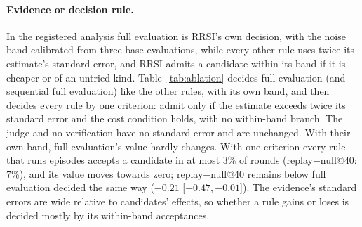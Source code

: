 \documentclass[11pt]{article}
\begin{document}
\begin{table}[t]
\centering
\small
\setlength{\tabcolsep}{3pt}
\caption{Agreement with full evaluation's acceptances on r2+r3 (21 acceptances in 80 rounds; post hoc). Recall: expected share of full evaluation's acceptances the rule also makes, with a 90\% block-bootstrap interval. Acc.: share of the rounds in which full evaluation keeps the incumbent where the rule accepts a candidate. Gain kept and dropped: mean held-out gain (points) of full evaluation's accepted candidates, weighted by the probability that the rule makes or does not make the same acceptance; Dropped: expected number it does not make. The last four columns split the difference in decision value: gains forgone by dropping helpful acceptances, harm avoided by dropping harmful ones, the value of what the rule accepts instead (another candidate, or one in a round where full evaluation keeps the incumbent), and the total. Lower block: sequential full evaluation on the other trajectories, with full evaluation's number of acceptances in parentheses.}
\label{tab:accept}
\end{table}

\paragraph{Evidence or decision rule.} In the registered analysis full evaluation is RRSI's own decision, with the noise band calibrated from three base evaluations, while every other rule uses twice its estimate's standard error, and RRSI admits a candidate within its band if it is cheaper or of an untried kind. Table~\ref{tab:ablation} decides full evaluation (and sequential full evaluation) like the other rules, with its own band, and then decides every rule by one criterion: admit only if the estimate exceeds twice its standard error and the cost condition holds, with no within-band branch. The judge and no verification have no standard error and are unchanged. With their own band, full evaluation's value hardly changes. With one criterion every rule that runs episodes accepts a candidate in at most 3\% of rounds (replay$-$null@40: 7\%), and its value moves towards zero; replay$-$null@40 remains below full evaluation decided the same way ($-0.21$ [$-0.47,-0.01$]). The evidence's standard errors are wide relative to candidates' effects, so whether a rule gains or loses is decided mostly by its within-band acceptances.
\end{document}
